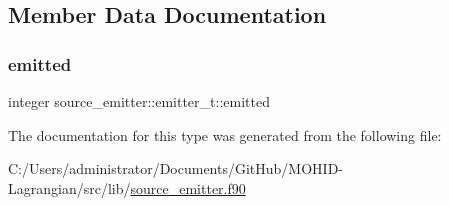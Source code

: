 \subsection{Member Data Documentation}
\mbox{\label{structsource__emitter_1_1emitter__t_a30062afe1a31dcfd77c90762d8c8cb5c}} 
\subsubsection{\texorpdfstring{emitted}{emitted}}
{\footnotesize\ttfamily integer source\+\_\+emitter\+::emitter\+\_\+t\+::emitted\hspace{0.3cm}{\ttfamily [private]}}



The documentation for this type was generated from the following file\+:\begin{DoxyCompactItemize}
\item 
C\+:/\+Users/administrator/\+Documents/\+Git\+Hub/\+M\+O\+H\+I\+D-\/\+Lagrangian/src/lib/\mbox{\hyperlink{source__emitter_8f90}{source\+\_\+emitter.\+f90}}\end{DoxyCompactItemize}
